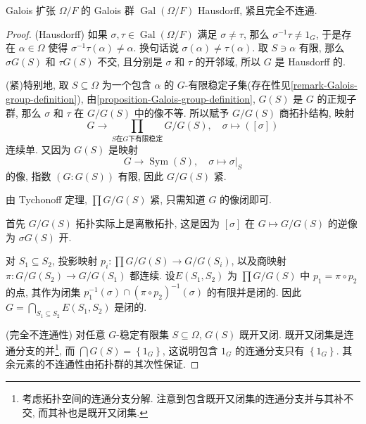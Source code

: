 \begin{proposition}
  \label{proposition-Galois-group-topological-properties}
  Galois 扩张 \( \Omega/F \) 的 Galois 群 \( \operatorname{Gal}(\Omega/F) \)
  Hausdorff, 紧且完全不连通.
\end{proposition}
\begin{proof}
  (Hausdorff)
  如果 \( \sigma, \tau \in \operatorname{Gal}(\Omega/F) \) 满足 \( \sigma \neq
  \tau \), 那么 \( \sigma^{-1}\tau \neq 1_G \), 于是存在 \( \alpha \in \Omega
  \) 使得 \( \sigma^{-1}\tau(\alpha) \neq \alpha \).
  换句话说 \( \sigma(\alpha) \neq \tau(\alpha) \).
  取 \( S \ni \alpha \) 有限, 那么 \( \sigma G(S) \) 和 \( \tau G(S) \) 不交,
  且分别是 \( \sigma \) 和 \( \tau \) 的开邻域, 所以 \( G \) 是 Hausdorff 的.

  (紧)特别地, 取 \( S \subseteq \Omega \) 为一个包含 \( \alpha \) 的 \( G
  \)-有限稳定子集(存在性见\cref{remark-Galois-group-definition}),
  由\cref{proposition-Galois-group-definition}, \( G(S) \) 是 \( G \)
  的正规子群, 那么 \( \sigma \) 和 \( \tau \) 在 \( G / G(S) \) 中的像不等.
  所以赋予 \( G/G(S) \) 商拓扑结构, 映射
  \[
    G \to \prod_{S \text{在} G \text{下有限稳定}} G/G(S),\quad \sigma \mapsto ([\sigma])
  \]
  连续单.
  又因为 \( G(S) \) 是映射
  \[
    G \to \operatorname{Sym}(S),\quad \sigma \mapsto \left. \sigma
      \right\vert_{S}
  \]
  的像, 指数 \( (G: G(S)) \) 有限, 因此 \( G/G(S) \) 紧.

  由 Tychonoff 定理, \( \prod G/G(S) \) 紧, 只需知道 \( G \) 的像闭即可.
  
  首先 \( G/G(S) \) 拓扑实际上是离散拓扑, 这是因为 \( [\sigma] \) 在 \( G
  \mapsto G/G(S) \) 的逆像为 \( \sigma G(S) \) 开.

  对 \( S_1 \subseteq S_2 \), 投影映射 \( p_i: \prod G/G(S) \to G/G(S_i) \),
  以及商映射 \( \pi: G/G(S_2) \to G/G(S_1) \) 都连续.
  设\( E(S_1, S_2) \) 为 \( \prod G/G(S) \) 中 \( p_1 = \pi \circ p_2 \)
  的点, 其作为闭集 \( p_1^{-1}(\sigma) \cap
  (\pi \circ p_2)^{-1}(\sigma) \) 的有限并是闭的.
  因此 \( G = \bigcap_{S_1 \subseteq S_2} E(S_1, S_2) \) 是闭的.

  (完全不连通性) 对任意 \( G \)-稳定有限集 \( S \subseteq \Omega \), \( G(S) \)
  既开又闭.
  既开又闭集是连通分支的并\footnote{考虑拓扑空间的连通分支分解.
  注意到包含既开又闭集的连通分支并与其补不交, 而其补也是既开又闭集.}, 而 \(
  \bigcap G(S) = \left\lbrace 1_G \right\rbrace \), 这说明包含 \( 1_G \)
  的连通分支只有 \( \left\lbrace 1_G \right\rbrace \).
  其余元素的不连通性由拓扑群的其次性保证.
\end{proof}

